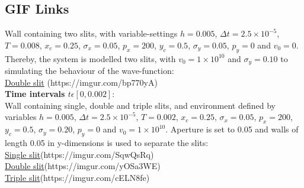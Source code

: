 \documentclass[10pt, nofootinbib, twocolumn]{revtex4-1}
\begin{document}


\subsection{GIF Links}\label{sec:links}
Wall containing two slits, with variable-settings $h = 0.005$, $\Delta t = 2.5\times10^{-5}$, $T = 0.008$, $x_c = 0.25$, $\sigma_x = 0.05$, $p_x = 200$, $y_c = 0.5$, $\sigma_y = 0.05$, $p_y = 0$ and $v_0 = 0$. Thereby, the system is modelled two slits, with $v_0 = 1\times10^{10}$ and $\sigma_y = 0.10$ to simulating the behaviour of the wave-function: \\

\href{https://imgur.com/bp770yA}{Double slit}\label{gif:double} (https://imgur.com/bp770yA)\\

\textbf{Time intervals $t\epsilon [0,0.002]$}:\\
Wall containing single, double and triple slits, and environment defined by variables $h = 0.005$, $\Delta t = 2.5\times10^{-5}$, $T = 0.002$, $x_c = 0.25$, $\sigma_x = 0.05$, $p_x = 200$, $y_c = 0.5$, $\sigma_y = 0.20$, $p_y = 0$ and $v_0 = 1\times10^{10}$. Aperture is set to 0.05 and walls of length 0.05 in y-dimensions is used to separate the slits: \\
\href{https://imgur.com/SqwQsRq}{Single slit}\label{gif:singlet}(https://imgur.com/SqwQsRq)\\
\href{https://imgur.com/yOSa3WE}{Double slit}\label{gif:doublet}(https://imgur.com/yOSa3WE)\\
\href{https://imgur.com/cELN8fe}{Triple slit}\label{gif:triplet}(https://imgur.com/cELN8fe)\\
\end{document}
